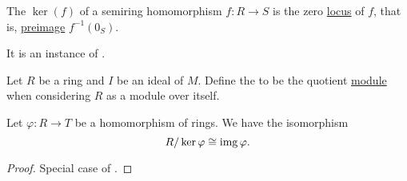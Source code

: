 \begin{definition}\label{def:semiring_kernel}
  The  \( \ker(f) \) of a semiring homomorphism \( f: R \to S \) is the zero \hyperref[def:zero_locus]{locus} of \( f \), that is, \hyperref[thm:function_properties/preimage]{preimage} \( f^{-1}(0_S) \).

  It is an instance of .
\end{definition}

\begin{definition}\label{def:quotient_semiring}
  Let \( R \) be a ring and \( I \) be an ideal of \( M \). Define the  to be the quotient \hyperref[def:quotient_left_module]{module} when considering \( R \) as a module over itself.
\end{definition}

\begin{theorem}\label{thm:homomorphism_theorem_for_rings}
  Let \( \varphi: R \to T \) be a homomorphism of rings. We have the isomorphism
  \begin{equation*}
    R / \ker \varphi \cong \operatorname{img} \varphi.
  \end{equation*}
\end{theorem}
\begin{proof}
  Special case of .
\end{proof}

